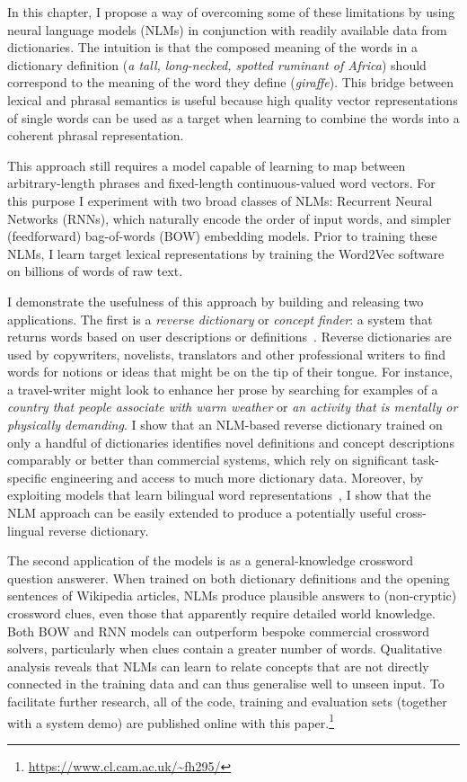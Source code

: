 In this chapter, I propose a way of overcoming some of these limitations by using neural language models (NLMs) in conjunction with readily available data from dictionaries. The intuition is that the composed meaning of the words in a dictionary definition (\emph{a tall, long-necked, spotted ruminant of Africa}) should correspond to the meaning of the word they define (\emph{giraffe}). This bridge between lexical and phrasal semantics is useful because high quality vector representations of single words can be used as a target when learning to combine the words into a coherent phrasal representation.
 
This approach still requires a model capable of learning to map between arbitrary-length phrases and fixed-length continuous-valued word vectors. For this purpose I experiment with two broad classes of NLMs: Recurrent Neural Networks (RNNs), which naturally encode the order of input words, and simpler (feedforward) bag-of-words (BOW) embedding models. Prior to training these NLMs, I learn target lexical representations by training the Word2Vec software~\citep{mikolov2013distributed} on billions of words of raw text. 

I demonstrate the usefulness of this approach by building and releasing two applications. The first is a \emph{reverse dictionary} or \emph{concept finder}: a system that returns words based on user descriptions or definitions~\citep{zock2004word}. Reverse dictionaries are used by copywriters, novelists, translators and other professional writers to find words for notions or ideas that might be on the tip of their tongue. For instance, a travel-writer might look to enhance her prose by searching for examples of a \emph{country that people associate with warm weather} or \emph{an activity that is mentally or physically demanding}. I show that an NLM-based reverse dictionary trained on only a handful of dictionaries identifies novel definitions and concept descriptions comparably or better than commercial systems, which rely on significant task-specific engineering and access to much more dictionary data. Moreover, by exploiting models that learn bilingual word representations~\citep{307754,Klementiev,hermann2013multilingual,gouws2014bilbowa}, I show that the NLM approach can be easily extended to produce a potentially useful cross-lingual reverse dictionary.

The second application of the models is as a general-knowledge crossword question answerer. When trained on both dictionary definitions and the opening sentences of Wikipedia articles, NLMs produce plausible answers to (non-cryptic) crossword clues, even those that apparently require detailed world knowledge. Both BOW and RNN models can outperform bespoke commercial crossword solvers, particularly when clues contain a greater number of words. Qualitative analysis reveals that NLMs can learn to relate concepts that are not directly connected in the training data and can thus generalise well to unseen input. To facilitate further research, all of the code, training and evaluation sets (together with a system demo) are published online with this paper.\footnote{
    \url{https://www.cl.cam.ac.uk/~fh295/}
}

